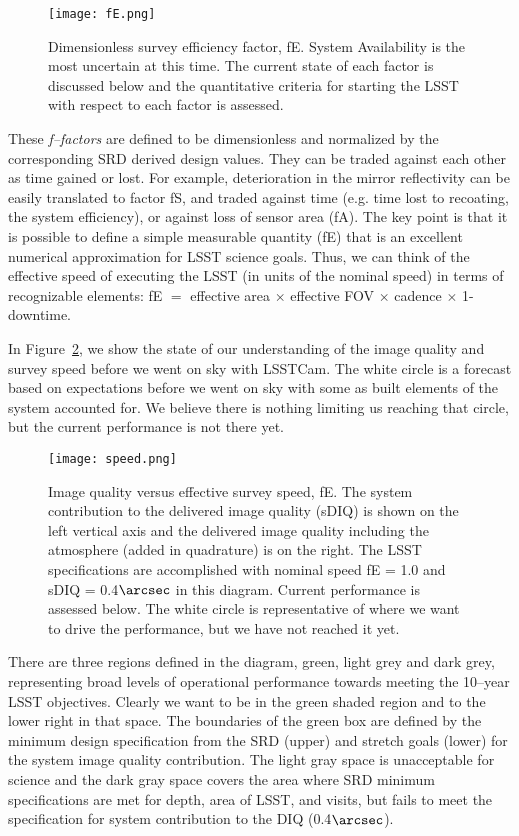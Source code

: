 \begin{figure}%
\centering
\texttt{[image: fE.png]}
\caption{Dimensionless survey efficiency factor, fE. System Availability is the most uncertain at this time. The current state of each factor is discussed below and the quantitative criteria for starting the LSST with respect to each factor is assessed.}
\label{fE}
\end{figure}

These {\it f--factors} are defined to be dimensionless and normalized by the corresponding SRD derived design values. They can be traded against each other as time gained or lost.  For example, deterioration in the mirror reflectivity can be easily translated to factor fS, and traded against time (e.g. time lost to recoating, the system efficiency), or against loss of sensor area (fA).
The key point is that it is possible to define a simple measurable quantity (fE) that is an excellent numerical approximation for LSST science goals. Thus, we can think of the effective speed of executing the LSST (in units of the nominal speed) in terms of recognizable elements:  fE $=$ effective area $\times$ effective FOV $\times$ cadence $\times$ 1-downtime.

In Figure~\ref{speed}, we show the state of our understanding of the image quality and survey speed before we went on sky with LSSTCam. The white circle is a forecast based on expectations before we went on sky with some as built elements of the system accounted for. We believe there is nothing limiting us reaching that circle, but the current performance is not there yet. 

\begin{figure}[t]
\centering
\texttt{[image: speed.png]}
\caption{Image quality versus effective survey speed, fE. The system contribution to the delivered image quality (sDIQ) is shown on the left vertical axis and the delivered image quality including the atmosphere (added in quadrature) is on the right. The LSST specifications are  accomplished with nominal speed fE = 1.0 and sDIQ = 0.4$\arcsec$ in this diagram. Current performance is assessed below. The white circle is representative of where we want to drive the performance, but we have not reached it yet.}
\label{speed}
\end{figure}

There are three regions defined in the diagram, green, light grey and dark grey, representing broad levels of operational performance towards meeting the 10--year LSST objectives. Clearly we want to be in the green shaded region and to the lower right in that space. The boundaries of the green box are defined by the minimum design specification from the SRD (upper) and stretch goals (lower) for the system image quality contribution.  The light gray space is unacceptable for science and the dark gray space covers the area where SRD minimum specifications are met for depth, area of LSST, and visits, but fails to meet the specification for system contribution to the DIQ (0.4$\arcsec$). 


